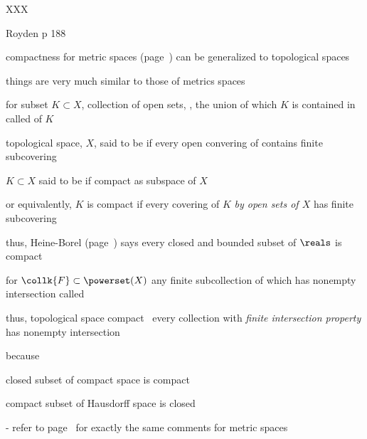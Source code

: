 \documentclass[17pt,landscape]{foils}
\newcommand\openconv{\collk{U}}
\begin{document}
{{{\bit
	\item XXX

	\bit
		\item Royden p 188
	\eit
\eit
}{}




\bit
	\item compactness for metric spaces (page~\pageref{page:Compact-metric-spaces})
		can be generalized to topological spaces

	\bit
		\item things are very much {similar} to those of metrics spaces
	\eit

	\vitem for subset $K\subset X$, collection of open sets, \openconv, the union of which $K$ is contained in
		called  of $K$

	\vitem topological space, $X$, said to be  if every open convering of contains finite subcovering

	\vitem $K\subset X$ said to be  if compact as subspace of $X$

	\bit
		\item or equivalently, $K$ is compact if every covering of $K$ \emph{by open sets of $X$}
			has finite subcovering

		\item thus, Heine-Borel (page~\pageref{page:heine-borel-theorem}) says every closed and bounded subset of $\reals$
			is compact
	\eit

	\vitem for $\collk{F}\subset\powerset(X)$ any finite subcollection of which has nonempty intersection
		called 

	\vitem thus, topological space compact \iaoi\ every collection with \emph{finite intersection property}
		has nonempty intersection
\eit



\bit
	\item {} because
	\bit
		\item closed subset of compact space is compact
		\item compact subset of Hausdorff space is closed%
	\eit
	\item [-] refer to page~\pageref{page:Compact-metric-spaces---other-facts} for exactly the same comments for metric spaces

}}
\end{document}
